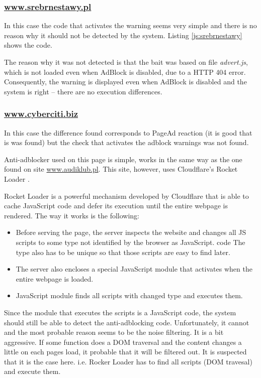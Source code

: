 \subsubsection{\url{www.srebrnestawy.pl}}
In this case the code that activates the warning seems very simple and there is no reason why
it should not be detected by the system. Listing \ref{js:srebrnestawy} shows the code.



The reason why it was not detected is that the bait was based on file \emph{advert.js}, which is not loaded 
even when AdBlock is disabled, due to a HTTP 404 error. Consequently, the warning is displayed even 
when AdBlock is disabled and the system is right -- there are no execution differences.

\subsubsection{\url{www.cyberciti.biz}}
In this case the difference found corresponds to PageAd reaction (it is good that is was found)
but the check that activates the adblock warnings was not found.

Anti-adblocker used on this page is simple, works in the same way as the one found on site \url{www.audiklub.pl}.
This site, however, uses Cloudflare's Rocket Loader \cite{cloud-flare:rocket-loader}.

Rocket Loader is a powerful mechanism developed by Cloudflare that is able to cache JavaScript code and defer its execution 
until the entire webpage is rendered. The way it works is the following: 
\begin{itemize}
  \item  Before serving the page, the server inspects the website and changes all JS scripts 
            to some type not identified by the browser as JavaScript. code 
            The type also has to be unique so that those scripts are easy to find later.
  \item The server also encloses a special JavaScript module that activates when the entire webpage is loaded.
  \item JavaScript module finds all scripts with changed type and executes them.
\end{itemize}

Since the module that executes the scripts is a JavaScript code, the system should still be able
to detect the anti-adblocking code. Unfortunately, it cannot and the most probable reason seems 
to be the noise filtering. It is a bit aggressive. If some function does a DOM traversal and
the content changes a little on each pages load, it probable that it will be filtered out.
It is suspected that it is the case here. i.e. Rocker Loader has to find all scripts (DOM travesal) and execute them.

